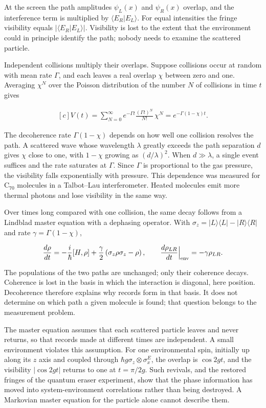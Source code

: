 \documentclass[11pt,oneside]{book}
\newenvironment{centeredalign}{\[\begin{gathered}[c]}{\end{gathered}\]}
\newcommand{\ket}[1]{\lvert #1\rangle}
\newcommand{\bra}[1]{\langle #1\rvert}
\begin{document}
At the screen the path amplitudes \(\psi_L(x)\) and \(\psi_R(x)\) overlap, and the interference term is multiplied by \(\langle E_R|E_L\rangle\). For equal intensities the fringe visibility equals \(|\langle E_R|E_L\rangle|\). Visibility is lost to the extent that the environment could in principle identify the path; nobody needs to examine the scattered particle.

Independent collisions multiply their overlaps. Suppose collisions occur at random with mean rate \(\Gamma\), and each leaves a real overlap \(\chi\) between zero and one. Averaging \(\chi^N\) over the Poisson distribution of the number \(N\) of collisions in time \(t\) gives

\begin{centeredalign}
V(t)=\sum_{N=0}^\infty e^{-\Gamma t}\frac{(\Gamma t)^N}{N!}\,\chi^N=e^{-\Gamma(1-\chi)t}.
\end{centeredalign}

The decoherence rate \(\Gamma(1-\chi)\) depends on how well one collision resolves the path. A scattered wave whose wavelength \(\lambda\) greatly exceeds the path separation \(d\) gives \(\chi\) close to one, with \(1-\chi\) growing as \((d/\lambda)^2\). When \(d\gg\lambda\), a single event suffices and the rate saturates at \(\Gamma\). Since \(\Gamma\) is proportional to the gas pressure, the visibility falls exponentially with pressure. This dependence was measured for \(\mathrm{C}_{70}\) molecules in a Talbot--Lau interferometer. Heated molecules emit more thermal photons and lose visibility in the same way.

Over times long compared with one collision, the same decay follows from a Lindblad master equation with a dephasing operator. With \(\sigma_z=\ket L\bra L-\ket R\bra R\) and rate \(\gamma=\Gamma(1-\chi)\),

\begin{centeredalign}
\frac{d\rho}{dt}=-\frac{i}{\hbar}[H,\rho]+\frac{\gamma}{2}\left(\sigma_z\rho\sigma_z-\rho\right),
\qquad \frac{d\rho_{LR}}{dt}\Big|_{\rm env}=-\gamma\rho_{LR}.
\end{centeredalign}

The populations of the two paths are unchanged; only their coherence decays. Coherence is lost in the basis in which the interaction is diagonal, here position. Decoherence therefore explains why records form in that basis. It does not determine on which path a given molecule is found; that question belongs to the measurement problem.

The master equation assumes that each scattered particle leaves and never returns, so that records made at different times are independent. A small environment violates this assumption. For one environmental spin, initially up along its \(z\) axis and coupled through \(\hbar g\sigma_z\otimes\sigma_x^E\), the overlap is \(\cos2gt\), and the visibility \(|\cos2gt|\) returns to one at \(t=\pi/2g\). Such revivals, and the restored fringes of the quantum eraser experiment, show that the phase information has moved into system-environment correlations rather than being destroyed. A Markovian master equation for the particle alone cannot describe them.
\end{document}
